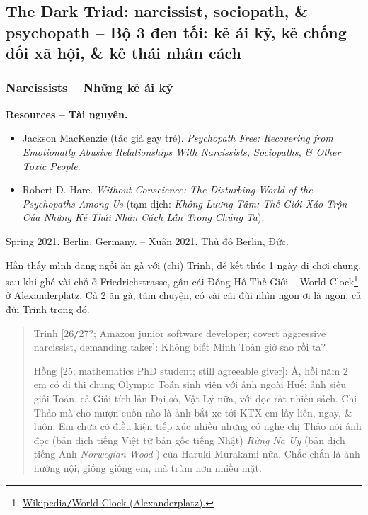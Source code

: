 \documentclass[12pt]{article}
\begin{document}
\subsection{The Dark Triad: narcissist, sociopath, \& psychopath -- Bộ 3 đen tối: kẻ ái kỷ, kẻ chống đối xã hội, \& kẻ thái nhân cách}

\subsubsection{Narcissists -- Những kẻ ái kỷ}
\textbf{\textsf{Resources -- Tài nguyên.}}
\begin{itemize}
	\item \cite{MacKenzie2015} {\sc Jackson MacKenzie} (tác giả gay trẻ). {\it Psychopath Free: Recovering from Emotionally Abusive Relationships With Narcissists, Sociopaths, \& Other Toxic People}.
	\item \cite{Hare1999} {\sc Robert D. Hare}. {\it Without Conscience: The Disturbing World of the Psychopaths Among Us} (tạm dịch: {\it Không Lương Tâm: Thế Giới Xáo Trộn Của Những Kẻ Thái Nhân Cách Lẫn Trong Chúng Ta}).
\end{itemize}
\begin{flushright}
	Spring 2021. Berlin, Germany. -- Xuân 2021. Thủ đô Berlin, Đức.
\end{flushright}
Hắn thấy mình đang ngồi ăn gà với (chị) Trinh, để kết thúc 1 ngày đi chơi chung, sau khi ghé vài chỗ ở Friedrichstrasse, gần cái Đồng Hồ Thế Giới -- World Clock\footnote{\href{https://en.wikipedia.org/wiki/World_Clock_(Alexanderplatz)}{Wikipedia{\tt/}World Clock (Alexanderplatz).}} ở Alexanderplatz. Cả 2 ăn gà, tám chuyện, có vài cái đùi nhìn ngon ơi là ngon, cả đùi Trinh trong đó. 
\begin{quote}
	{\sf Trinh [26{\tt/}27?; Amazon junior software developer; covert aggressive narcissist, demanding taker]}: Không biết Minh Toàn giờ sao rồi ta?
	
	{\sf Hồng [25; mathematics PhD student; still agreeable giver]}: À, hồi năm 2 em có đi thi chung Olympic Toán sinh viên với ảnh ngoài Huế: ảnh siêu giỏi Toán, cả Giải tích lẫn Đại số, Vật Lý nữa, với đọc rất nhiều sách. Chị Thảo mà cho mượn cuốn nào là ảnh bắt xe tới KTX em lấy liền, ngay, \& luôn. Em chưa có điều kiện tiếp xúc nhiều nhưng có nghe chị Thảo nói ảnh đọc (bản dịch tiếng Việt từ bản gốc tiếng Nhật) {\it Rừng Na Uy} \cite{Murakami_rung_Na_Uy} (bản dịch tiếng Anh {\it Norwegian Wood} \cite{Murakami_Norwegian_wood}) của {\sc Haruki Murakami} nữa. Chắc chắn là ảnh hướng nội, giống giống em, mà trùm hơn nhiều mặt.
\end{quote}
\end{document}
